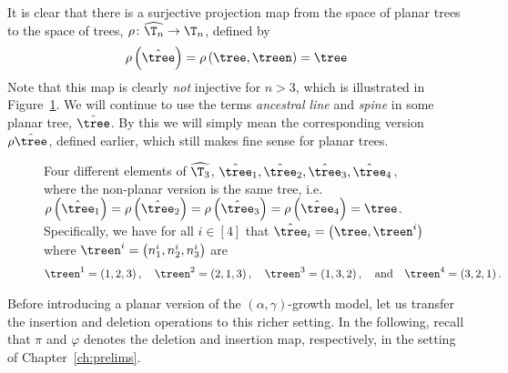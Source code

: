 \noindent
It is clear that there is a surjective projection map from the space of planar trees to the space of trees, $\rho \colon \widehat{\T_n} \to \T_n$, defined by
%
\begin{align}\label{projectionmap}
  \rho \left( \hat{\tree} \right) = \rho \left( \tree, \treen \right) = \tree
\end{align}
%
Note that this map is clearly \textit{not} injective for $n > 3$, which is illustrated in Figure~\ref{fig:planartree}.
We will continue to use the terms \textit{ancestral line} and \textit{spine} in some planar tree, $\hat{\tree}$.
By this we will simply mean the corresponding version $\rho{\hat{\tree}}$, defined earlier, which still makes fine sense for planar trees. \\
%
\begin{figure}[t]
    \centering
    
    \captionsetup{singlelinecheck=off}
    \caption[fig:planartree]{Four different elements of $\widehat{\T_3}$, $\hat{\tree}_1, \hat{\tree}_2, \hat{\tree}_3, \hat{\tree}_4$, where the non-planar version is the same tree, i.e.\ $\rho\left( \hat{\tree}_1 \right) = \rho\left( \hat{\tree}_2 \right) = \rho\left( \hat{\tree}_3 \right) = \rho\left( \hat{\tree}_4 \right) = \tree$.
        Specifically, we have for all $i \in [4]$ that $\hat{\tree}_i = \left( \tree, \treen^i \right)$ where $\treen^i = \left( n_1^i, n_2^i, n_3^i \right)$ are
    \begin{align*}
        \treen^1 = \left( 1, 2, 3 \right),
        \quad
        \treen^2 = \left( 2, 1, 3 \right),
        \quad
        \treen^3 = \left( 1, 3, 2 \right),
        \quad \text{and} \quad
        \treen^4 = \left( 3, 2, 1 \right).
    \end{align*}
}\label{fig:planartree}
\end{figure}
%
Before introducing a planar version of the $(\alpha, \gamma)$-growth model, let us transfer the insertion and deletion operations to this richer setting.
In the following, recall that $\pi$ and $\varphi$ denotes the deletion and insertion map, respectively, in the setting of Chapter~\ref{ch:prelims}.
%
